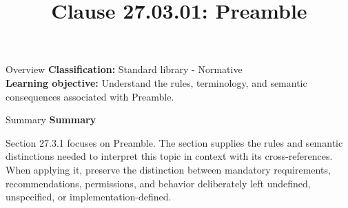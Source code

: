 \documentclass[10pt,letterpaper]{article}
\title{Clause 27.03.01: Preamble}
\author{}
\date{}
\begin{document}
\maketitle
\begin{CornellOverviewBox}{Overview}
\textbf{Classification:} Standard library - Normative\\[2pt]
\textbf{Learning objective:} Understand the rules, terminology, and semantic consequences associated with Preamble.
\end{CornellOverviewBox}\begin{CornellSummaryBox}{Summary}
{\sffamily\bfseries\color{Accent} Summary}\par\vspace{3pt}Section 27.3.1 focuses on Preamble. The section supplies the rules and semantic distinctions needed to interpret this topic in context with its cross-references. When applying it, preserve the distinction between mandatory requirements, recommendations, permissions, and behavior deliberately left undefined, unspecified, or implementation-defined.
\end{CornellSummaryBox}
\end{document}
